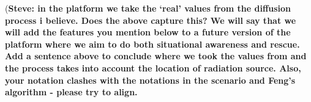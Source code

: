 (\textbf{Steve: in the platform we take the `real' values from the diffusion process i believe. Does the above capture this? We will say that we will add the features you mention below to a future version of the platform where we aim to do both situational awareness and rescue. Add a sentence above to conclude where we took the values from and the process takes into account the  location of radiation source. Also, your notation clashes with the notations in the scenario and Feng's algorithm - please try to align.}
%
